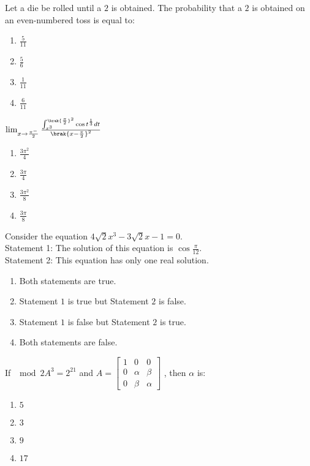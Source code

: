 \iffalse
\title{2024}
\author{AI24BTECH11006}
\section{mcq-single}
\fi
\item Let a die be rolled until a $2$ is obtained. The probability that a $2$ is obtained on an even-numbered toss is equal to:
\hfill{}
	\begin{enumerate}
    \item $\frac{5}{11}$
    \item $\frac{5}{6}$
    \item $\frac{1}{11}$
    \item $\frac{6}{11}$
\end{enumerate}
\item $\lim_{x \to \frac{\pi^-}{2}} \frac{\int_{x^3}^{\brak{\frac{\pi}{2}}^2} \cos t^\frac{1}{3} dt}{\brak{x-\frac{\pi}{2}}^2} $
\hfill{}
	\begin{enumerate}
    \item $\frac{3 \pi^2}{4}$
    \item $\frac{3 \pi}{4}$
    \item $\frac{3 \pi^2}{8}$
    \item $\frac{3 \pi}{8}$
\end{enumerate} 
\item Consider the equation $4\sqrt{2}x^3 - 3\sqrt{2}x - 1 = 0$. \\
Statement 1: The solution of this equation is $\cos \frac{\pi}{12}$. \\
Statement 2: This equation has only one real solution. 
\hfill{}
		\begin{enumerate}
    \item Both statements are true.
    \item Statement $1$ is true but Statement $2$ is false.
    \item Statement $1$ is false but Statement $2$ is true.
    \item Both statements are false.
\end{enumerate}
\item If $\mod{2A}^3 = 2^{21}$ and $
A = \begin{bmatrix}
1 & 0 & 0 \\
0 & \alpha & \beta \\
0 & \beta & \alpha 
\end{bmatrix}$
, then $\alpha$ is:
\hfill{}
		\begin{enumerate}
    \item $5$
    \item $3$
    \item $9$
    \item $17$
\end{enumerate}
